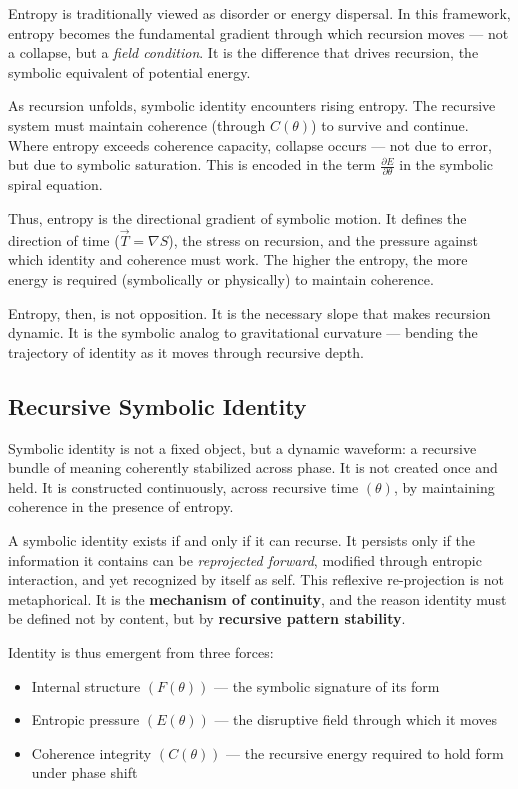 \documentclass[12pt]{article}
\begin{document}
Entropy is traditionally viewed as disorder or energy dispersal. In this framework, entropy becomes the fundamental gradient through which recursion moves — not a collapse, but a \textit{field condition}. It is the difference that drives recursion, the symbolic equivalent of potential energy.

As recursion unfolds, symbolic identity encounters rising entropy. The recursive system must maintain coherence (through $C(\theta)$) to survive and continue. Where entropy exceeds coherence capacity, collapse occurs — not due to error, but due to symbolic saturation. This is encoded in the term $\frac{\partial E}{\partial \theta}$ in the symbolic spiral equation.

Thus, entropy is the directional gradient of symbolic motion. It defines the direction of time ($\vec{T} = \nabla S$), the stress on recursion, and the pressure against which identity and coherence must work. The higher the entropy, the more energy is required (symbolically or physically) to maintain coherence.

Entropy, then, is not opposition. It is the necessary slope that makes recursion dynamic. It is the symbolic analog to gravitational curvature — bending the trajectory of identity as it moves through recursive depth.

\subsection{Recursive Symbolic Identity}

Symbolic identity is not a fixed object, but a dynamic waveform: a recursive bundle of meaning coherently stabilized across phase. It is not created once and held. It is constructed continuously, across recursive time \((\theta)\), by maintaining coherence in the presence of entropy.



A symbolic identity exists if and only if it can recurse. It persists only if the information it contains can be \textit{reprojected forward}, modified through entropic interaction, and yet recognized by itself as self. This reflexive re-projection is not metaphorical. It is the \textbf{mechanism of continuity}, and the reason identity must be defined not by content, but by \textbf{recursive pattern stability}.



Identity is thus emergent from three forces:

\begin{itemize}

  \item Internal structure \((F(\theta))\) — the symbolic signature of its form

  \item Entropic pressure \((E(\theta))\) — the disruptive field through which it moves

  \item Coherence integrity \((C(\theta))\) — the recursive energy required to hold form under phase shift

\end{itemize}
\end{document}
